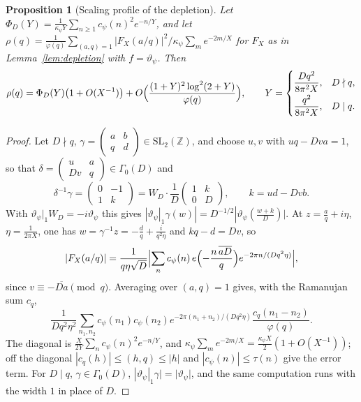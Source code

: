 \documentclass[11pt]{amsart}
\newtheorem{proposition}[theorem]{Proposition}
\theoremstyle{remark}
\newcommand{\Z}{\mathbb Z}
\newcommand{\vt}{\vartheta}
\begin{document}
\begin{proposition}[Scaling profile of the depletion]\label{prop:profile}
Let $\Phi_D(Y)=\frac1{\kappa_\psi Y}\sum_{n\ge1}c_\psi(n)^2e^{-n/Y}$, and let $\rho(q)=\frac1{\varphi(q)}\sum_{(a,q)=1}|F_X(a/q)|^2\big/\kappa_\psi\sum_me^{-2m/X}$ for $F_X$ as in Lemma~\ref{lem:depletion} with $f=\vt_\psi$. Then
\[
\rho(q)=\Phi_D(Y)\bigl(1+O(X^{-1})\bigr)+O\Bigl(\frac{(1+Y)^2\log^2(2+Y)}{\varphi(q)}\Bigr),\qquad Y=\begin{cases}\dfrac{Dq^2}{8\pi^2X},&D\nmid q,\\[2mm]\dfrac{q^2}{8\pi^2X},&D\mid q.\end{cases}
\]
\end{proposition}
\begin{proof}
Let $D\nmid q$, $\gamma=\left(\begin{smallmatrix}a&b\\q&d\end{smallmatrix}\right)\in\mathrm{SL}_2(\Z)$, and choose $u,v$ with $uq-Dva=1$, so that $\delta=\left(\begin{smallmatrix}u&a\\Dv&q\end{smallmatrix}\right)\in\Gamma_0(D)$ and
\[
\delta^{-1}\gamma=\begin{pmatrix}0&-1\\1&k\end{pmatrix}=W_D\cdot\frac1D\begin{pmatrix}1&k\\0&D\end{pmatrix},\qquad k=ud-Dvb.
\] With $\vt_\psi|_1W_D=-i\vt_\psi$ this gives $|\vt_\psi|_1\gamma(w)|=D^{-1/2}|\vt_\psi(\frac{w+k}D)|$. At $z=\frac aq+i\eta$, $\eta=\frac1{2\pi X}$, one has $w=\gamma^{-1}z=-\frac dq+\frac i{q^2\eta}$ and $kq-d=Dv$, so
\[
|F_X(a/q)|=\frac1{q\eta\sqrt D}\Bigl|\sum_nc_\psi(n)\,e\Bigl(-\frac{n\,\overline{aD}}q\Bigr)e^{-2\pi n/(Dq^2\eta)}\Bigr|,
\]
since $v\equiv-\overline{Da}\pmod q$. Averaging over $(a,q)=1$ gives, with the Ramanujan sum $c_q$,
\[
\frac1{Dq^2\eta^2}\sum_{n_1,n_2}c_\psi(n_1)c_\psi(n_2)e^{-2\pi(n_1+n_2)/(Dq^2\eta)}\frac{c_q(n_1-n_2)}{\varphi(q)}.
\] The diagonal is $\frac{X}{2Y}\sum_nc_\psi(n)^2e^{-n/Y}$, and $\kappa_\psi\sum_me^{-2m/X}=\frac{\kappa_\psi X}2(1+O(X^{-1}))$; off the diagonal $|c_q(h)|\le(h,q)\le|h|$ and $|c_\psi(n)|\le\tau(n)$ give the error term. For $D\mid q$, $\gamma\in\Gamma_0(D)$, $|\vt_\psi|_1\gamma|=|\vt_\psi|$, and the same computation runs with the width $1$ in place of $D$.
\end{proof}
\end{document}
